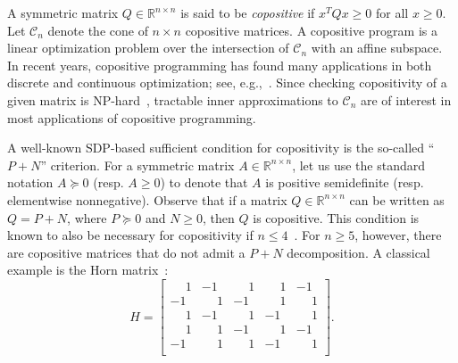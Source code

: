 \documentclass[12pt]{article}
\newcommand{\reals}{\mathbb{R}}
\newcommand{\mcC}{\mathcal{C}}
\theoremstyle{remark}
\begin{document}
A symmetric matrix $Q \in \reals^{n \times n}$ is said to be \emph{copositive} if $x^T Q x \geq 0$ for all $x \geq 0$. Let $\mcC_n$ denote the cone of $n\times n$ copositive matrices. A copositive program is a linear optimization problem over the intersection of $\mcC_n$ with an affine subspace. 
In recent years, copositive programming has found many applications in both discrete and continuous optimization; see, e.g.,~\cite{burer2012copositive,dur2010copositive}. 
Since checking copositivity of a given matrix is NP-hard~\cite{murty1987some}, tractable inner approximations to $\mcC_n$ are of interest in most applications of copositive programming. 

A well-known SDP-based sufficient condition for copositivity is the so-called {``$P+N$'' criterion}. For a symmetric matrix $A \in \reals^{n \times n}$, let us use the standard notation $A \succeq 0$ (resp. $A \geq 0$) to denote that $A$ is positive semidefinite (resp. elementwise nonnegative). Observe that if a matrix $Q\in\reals^{n\times n}$ can be written as $Q = P + N$, where $P \succeq 0$ and $N \geq 0$, then $Q$ is copositive. 
This condition is known to also be necessary for copositivity if $n\le 4$~\cite{Diananda1962}. For $n\ge 5$, however, there are copositive matrices that do not admit a $P+N$ decomposition. A classical example is the Horn matrix~\cite{Diananda1962}:
\begin{equation}\label{eq:horn}
  H=\begin{bmatrix}
    \phantom{-}1 & -1 & \phantom{-}1 & \phantom{-}1 & -1 \\
    -1 & \phantom{-}1 & -1 & \phantom{-}1 & \phantom{-}1 \\
    \phantom{-}1 & -1 & \phantom{-}1 & -1 & \phantom{-}1 \\
    \phantom{-}1 & \phantom{-}1 & -1 & \phantom{-}1 & -1 \\
    -1 & \phantom{-}1 & \phantom{-}1 & -1 & \phantom{-}1 \\
  \end{bmatrix}.
\end{equation}
\end{document}

